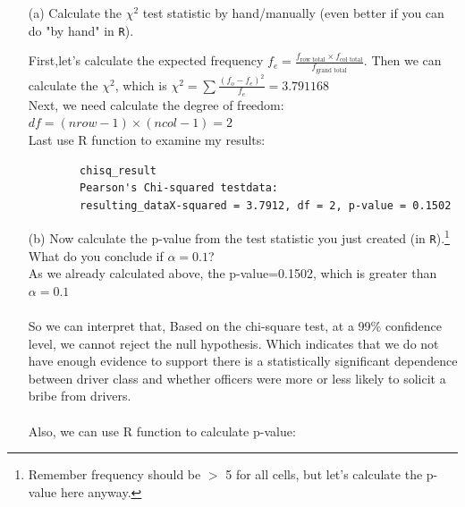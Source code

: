 \documentclass[12pt,letterpaper]{article}
\begin{document}
\begin{enumerate}
	
	\item [(a)]
	Calculate the $\chi^2$ test statistic by hand/manually (even better if you can do "by hand" in \texttt{R}).\\
	\vspace{.7cm}
	
	\vspace{.15cm}
	\noindent First,let's calculate the expected frequency $f_e = \frac{f_{\text{row total}} \times f_{\text{col total}}}{f_{\text{grand total}}}$. Then we can calculate the $\chi^2$, which is $\chi^2=\sum \frac{{(f_{o} - f_{e})^2}}{f_{e}}=3.791168$\\	
	
	
	
	\vspace{.15cm}
	\noindent Next, we need calculate the degree of freedom: $df=(nrow-1)\times(ncol-1)=2$\\
	
	
	
	\vspace{.15cm}
	\noindent Last use R function to examine my results:\\
	
	
	
	\begin{verbatim}
		chisq_result	
		Pearson's Chi-squared testdata: 
		resulting_dataX-squared = 3.7912, df = 2, p-value = 0.1502
	\end{verbatim}
	\vspace{.5cm}
	
	\item [(b)]
	Now calculate the p-value from the test statistic you just created (in \texttt{R}).\footnote{Remember frequency should be $>$ 5 for all cells, but let's calculate the p-value here anyway.}  What do you conclude if $\alpha = 0.1$?\\
	
	\vspace{.15cm}
	\noindent As we already calculated above, the p-value=0.1502, which is greater than $\alpha=0.1$\. \\
	\\So we can interpret that, Based on the chi-square test, at a 99$\%$ confidence level, we cannot reject the null hypothesis. Which indicates that we do not have enough evidence to support there is a statistically significant dependence between driver class and whether officers were more or less likely to solicit a bribe from drivers.\\
	\\Also, we can use R function to calculate p-value:\\
	

\end{enumerate}
\end{document}
